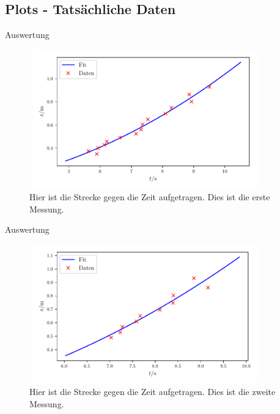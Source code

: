 \subsection{Plots - Tatsächliche Daten}
\begin{frame}{Auswertung}
    \begin{figure}   
    
    \centering
    \includegraphics[width=10cm, height=6cm]{build/plot1a.pdf}
    \caption{Hier ist die Strecke gegen die Zeit aufgetragen. Dies ist die erste Messung.} 

    \label{fig:plot1a}
\end{figure}
\end{frame}

\begin{frame}{Auswertung}
    \begin{figure}   
    
    \centering
    \includegraphics[width=10cm, height=6cm]{build/plot2a.pdf}
    \caption{Hier ist die Strecke gegen die Zeit aufgetragen. Dies ist die zweite Messung.} 

    \label{fig:plot2a}
\end{figure}
\end{frame}

